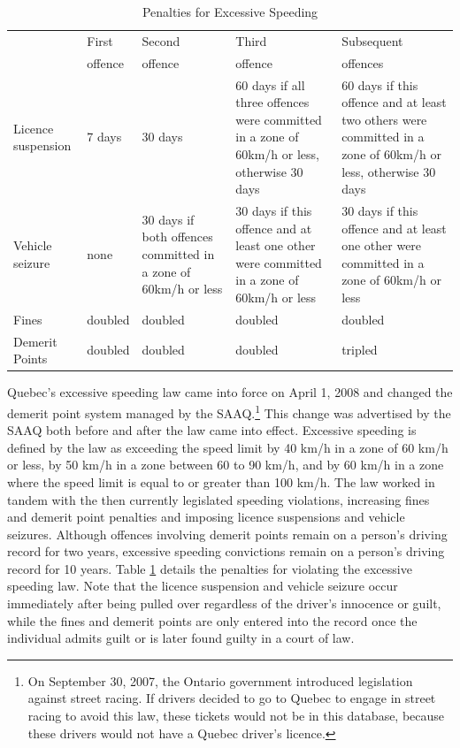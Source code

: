 \documentclass{cje}
\begin{document}
\begin{table}%
\centering
\begin{tabular}{p{1.5cm} p{1.5cm} p{2cm} p{2.5cm} p{2.5cm}}
  \hline
     				& First  	& Second	& Third 	& Subsequent  \\ 
				& offence	& offence	& offence 	& offences \\
  \hline
Licence suspension
	&  7 days
		& 30 days
			& 60 days if all three offences were committed in a zone of 60km/h or less, 
				otherwise 30 days
				& 60 days if this offence and at least two others were committed 
					in a zone of 60km/h or less, otherwise 30 days \\
   \hline
Vehicle seizure 
	& none
		& 30 days if both offences committed in a zone of 60km/h or less
			& 30 days if this offence and at least one other were committed 
				in a zone of 60km/h or less
				& 30 days if this offence and at least one other were committed 
					in a zone of 60km/h or less \\
   \hline
Fines			& doubled			& doubled			& doubled			& doubled \\
   \hline
Demerit Points	& doubled			& doubled			& doubled			& tripled \\
   \hline
\end{tabular}
\caption{Penalties for Excessive Speeding} 
\label{tab:penalties}
\end{table}

Quebec’s excessive speeding law came into force on April 1, 2008 
and changed the demerit point system managed by the SAAQ.\footnote{%
%
On September 30, 2007, the Ontario government introduced legislation against street racing. 
If drivers decided to go to Quebec to engage in street racing to avoid this law, 
these tickets would not be in this database, 
because these drivers would not have a Quebec driver's licence.} 
% 
This change was advertised by the SAAQ both before and after the law came into effect. 
Excessive speeding is defined by the law as exceeding the speed limit 
by 40 km/h in a zone of 60 km/h or less, 
by 50 km/h in a zone between 60 to 90 km/h, 
and by 60 km/h in a zone where the speed limit is equal to or greater than 100 km/h. 
The law worked in tandem with the then currently legislated speeding violations, 
increasing fines and demerit point penalties 
and imposing licence suspensions and vehicle seizures. 
Although offences involving demerit points remain on a person’s driving record for two years,
excessive speeding convictions remain on a person’s driving record for 10 years. 
% 
Table \ref{tab:penalties} details the penalties for violating the excessive speeding law. 
Note that the licence suspension and vehicle seizure occur 
immediately after being pulled over regardless of the driver’s innocence or guilt, 
while the fines and demerit points are only entered into the record 
once the individual admits guilt or is later found guilty in a court of law. 
\end{document}
